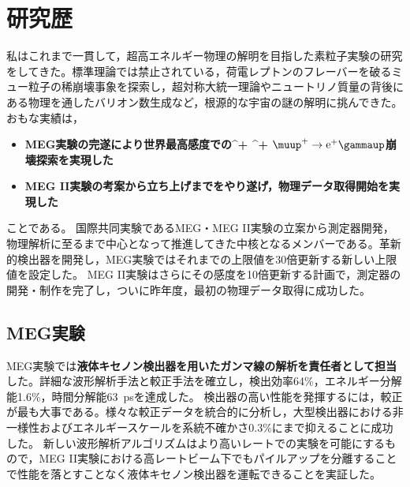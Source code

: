 \documentclass[11pt,a4paper,uplatex,dvipdfmx]{ujarticle} 		%
\newcommand{\研究課題名}{象の卵}
\newcommand{\研究機関名}{東京大学}
\newcommand{\研究代表者氏名}{内山雄祐}
\newcommand{\研究期間の最終元号年度}{6}  %
\renewcommand{\emph}[1]{{\sffamily\bfseries{#1}}}
\newcommand*{\megc}{\ifmmode\muup^+ \to \mathrm{e}^+ \gammaup\else$\muup^+ \to \mathrm{e}^+ \gammaup$\fi}
\begin{document}



%
\noindent


	
\newpage

\section{研究歴}
\vspace{2zw}

私はこれまで一貫して，超高エネルギー物理の解明を目指した素粒子実験の研究をしてきた。標準理論では禁止されている，荷電レプトンのフレーバーを破るミュー粒子の稀崩壊事象を探索し，超対称大統一理論やニュートリノ質量の背後にある物理を通したバリオン数生成など，根源的な宇宙の謎の解明に挑んできた。
おもな実績は，
\begin{itemize}
  \setlength{\parskip}{0cm} %
  \setlength{\itemsep}{0cm} %
\item	\emph{MEG実験の完遂により世界最高感度での\megc 崩壊探索を実現した}
\item	\emph{MEG II実験の考案から立ち上げまでをやり遂げ，物理データ取得開始を実現した}
\end{itemize}
ことである。
国際共同実験であるMEG・MEG II実験の立案から測定器開発，物理解析に至るまで中心となって推進してきた中核となるメンバーである。革新的検出器を開発し\cite{Adam:2013vqa}，MEG実験ではそれまでの上限値を30倍更新する新しい上限値を設定した\cite{TheMEG:2016wtm}。
MEG II実験はさらにその感度を10倍更新する計画で\cite{upgrade_proposal, Baldini:2018nnn}，測定器の開発・制作を完了し\cite{Mori:highenergy}，ついに昨年度，最初の物理データ取得に成功した\cite{cdch_2023,ptc_2023,trigger_2023,xec_2023}。

\subsection{MEG実験}
MEG実験では\emph{液体キセノン検出器を用いたガンマ線の解析を責任者として担当}した。詳細な波形解析手法と較正手法を確立し，検出効率64\%，エネルギー分解能1.6\%，時間分解能63~psを達成した\cite{gamma_rec, TheMEG:2016wtm}。
検出器の高い性能を発揮するには，較正が最も大事である。様々な較正データを統合的に分析し，大型検出器における非一様性およびエネルギースケールを系統不確かさ0.3\%にまで抑えることに成功した。
新しい波形解析アルゴリズムはより高いレートでの実験を可能にするもので，MEG II実験における高レートビーム下でもパイルアップを分離することで性能を落とすことなく液体キセノン検出器を運転できることを実証した。
\end{document}
